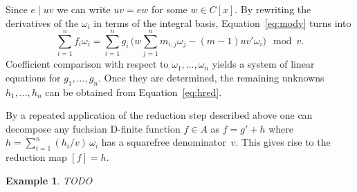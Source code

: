 \documentclass{sig-alternate}
\newtheorem{example}[theorem]{Example}
\begin{document}
Since $e\mid uv$ we can write $uv=ew$ for some $w\in C[x]$. By rewriting the
derivatives of the $\omega_i$ in terms of the integral basis,
Equation~\eqref{eq:modv} turns into
\[
  \sum_{i=1}^n f_i\omega_i =
  \sum_{i=1}^n g_i\, \biggl( w\sum_{j=1}^n m_{i,j}\omega_j - (m-1)uv'\omega_i \biggr) \mod v.
\]
Coefficient comparison with respect to $\omega_1,\ldots,\omega_n$ yields a
system of linear equations for $g_1,\ldots,g_n$. Once they are determined, the
remaining unknowns $h_1,\ldots,h_n$ can be obtained from
Equation~\eqref{eq:hred}.

By a repeated application of the reduction step described above
one can decompose any fuchsian D-finite function $f\in A$ as
$f=g'+h$ where $h=\sum_{i=1}^n (h_i/v)\,\omega_i$ has a squarefree
denominator~$v$. This gives rise to the reduction map $[f]=h$.

\begin{example}
TODO
\end{example}
\end{document}
